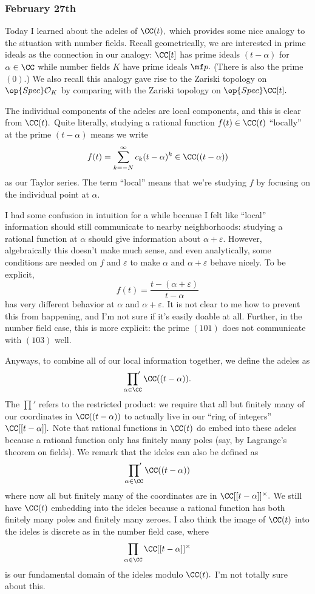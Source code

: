 \subsubsection{February 27th}
Today I learned about the adeles of $\CC(t),$ which provides some nice analogy to the situation with number fields. Recall geometrically, we are interested in prime ideals as the connection in our analogy: $\CC[t]$ has prime ideals $(t-\alpha)$ for $\alpha\in\CC$ while number fields $K$ have prime ideals $\mf p.$ (There is also the prime $(0).$) We also recall this analogy gave rise to the Zariski topology on $\op{Spec}\mathcal O_K$ by comparing with the Zariski topology on $\op{Spec}\CC[t].$

The individual components of the adeles are local components, and this is clear from $\CC(t).$ Quite literally, studying a rational function $f(t)\in\CC(t)$ ``locally'' at the prime $(t-\alpha)$ means we write
\[f(t)=\sum_{k=-N}^\infty c_k(t-\alpha)^k\in\CC((t-\alpha))\]
as our Taylor series. The term ``local'' means that we're studying $f$ by focusing on the individual point at $\alpha.$

I had some confusion in intuition for a while because I felt like ``local'' information should still communicate to nearby neighborhoods: studying a rational function at $\alpha$ should give information about $\alpha+\varepsilon.$ However, algebraically this doesn't make much sense, and even analytically, some conditions are needed on $f$ and $\varepsilon$ to make $\alpha$ and $\alpha+\varepsilon$ behave nicely. To be explicit,
\[f(t)=\frac{t-(\alpha+\varepsilon)}{t-\alpha}\]
has very different behavior at $\alpha$ and $\alpha+\varepsilon.$ It is not clear to me how to prevent this from happening, and I'm not sure if it's easily doable at all. Further, in the number field case, this is more explicit: the prime $(101)$ does not communicate with $(103)$ well.

Anyways, to combine all of our local information together, we define the adeles as
\[\sideset{}{'}\prod_{\alpha\in\CC}\CC((t-\alpha)).\]
The $\prod'$ refers to the restricted product: we require that all but finitely many of our coordinates in $\CC((t-\alpha))$ to actually live in our ``ring of integers'' $\CC[[t-\alpha]].$ Note that rational functions in $\CC(t)$ do embed into these adeles because a rational function only has finitely many poles (say, by Lagrange's theorem on fields). We remark that the ideles can also be defined as
\[\sideset{}{'}\prod_{\alpha\in\CC}\CC((t-\alpha))\]
where now all but finitely many of the coordinates are in $\CC[[t-\alpha]]^\times.$ We still have $\CC(t)$ embedding into the ideles because a rational function has both finitely many poles and finitely many zeroes. I also think the image of $\CC(t)$ into the ideles is discrete as in the number field case, where
\[\prod_{\alpha\in\CC}\CC[[t-\alpha]]^\times\]
is our fundamental domain of the ideles modulo $\CC(t).$ I'm not totally sure about this.

